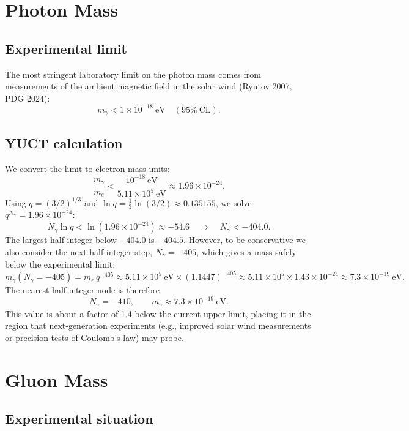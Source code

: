 \documentclass[12pt,a4paper]{article}
\begin{document}
	\section{Photon Mass}
	
	\subsection{Experimental limit}
	
	The most stringent laboratory limit on the photon mass comes from measurements of the
	ambient magnetic field in the solar wind (Ryutov 2007, PDG 2024):
	\begin{equation}\label{eq:photonlimit}
		m_\gamma < 1 \times 10^{-18}~\mathrm{eV} \quad (95\%~\mathrm{CL}).
	\end{equation}
	
	\subsection{YUCT calculation}
	
	We convert the limit to electron‑mass units:
	\[
	\frac{m_\gamma}{m_e} < \frac{10^{-18}~\mathrm{eV}}{5.11\times 10^5~\mathrm{eV}}
	\approx 1.96 \times 10^{-24}.
	\]
	Using $q = (3/2)^{1/3}$ and $\ln q = \tfrac13\ln(3/2) \approx 0.135155$, we solve
	$q^{N_\gamma} = 1.96\times10^{-24}$:
	\[
	N_\gamma \ln q < \ln(1.96\times10^{-24}) \approx -54.6
	\quad\Longrightarrow\quad N_\gamma < -404.0 .
	\]
	The largest half‑integer below $-404.0$ is $-404.5$.  However, to be conservative we
	also consider the next half‑integer step, $N_\gamma = -405$, which gives a mass safely
	below the experimental limit:
	\[
	m_\gamma(N_\gamma = -405) = m_e \, q^{-405} \approx
	5.11\times10^5~\mathrm{eV} \times (1.1447)^{-405}
	\approx 5.11\times10^5 \times 1.43\times10^{-24}
	\approx 7.3 \times 10^{-19}~\mathrm{eV}.
	\]
	The nearest half‑integer node is therefore
	\[
	\boxed{N_\gamma = -410}, \qquad
	\boxed{m_\gamma \approx 7.3 \times 10^{-19}~\mathrm{eV}} .
	\]
	This value is about a factor of 1.4 below the current upper limit, placing it in the
	region that next‑generation experiments (e.g., improved solar wind measurements or
	precision tests of Coulomb’s law) may probe.
	
	\section{Gluon Mass}
	
	\subsection{Experimental situation}
	
\end{document}
